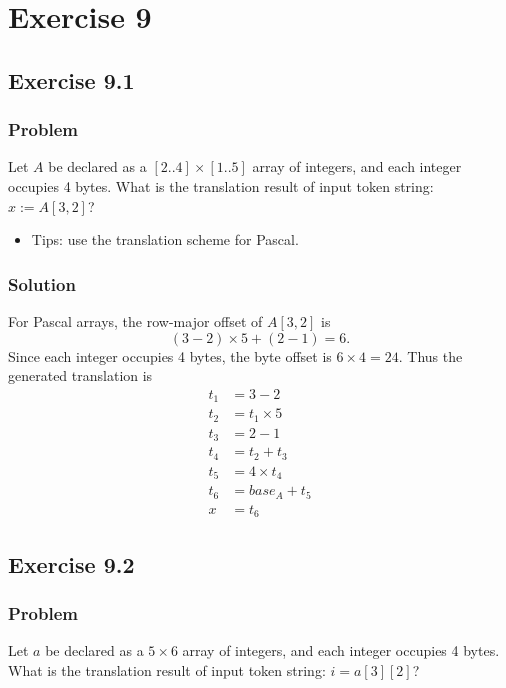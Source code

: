 \chapter{Exercise 9}

\section{Exercise 9.1}
\subsection{Problem}
Let $A$ be declared as a $[2..4] \times [1..5]$ array of integers, and each integer occupies 4 bytes.
What is the translation result of input token string: $x := A[3,2]$?

\begin{itemize}
    \item Tips: use the translation scheme for Pascal.
\end{itemize}

\subsection{Solution}
For Pascal arrays, the row-major offset of $A[3,2]$ is
\[
(3 - 2) \times 5 + (2 - 1) = 6.
\]
Since each integer occupies 4 bytes, the byte offset is $6 \times 4 = 24$.
Thus the generated translation is
\begin{align*}
t_1 &= 3 - 2 \\
t_2 &= t_1 \times 5 \\
t_3 &= 2 - 1 \\
t_4 &= t_2 + t_3 \\
t_5 &= 4 \times t_4 \\
t_6 &= base_A + t_5 \\
x &= t_6
\end{align*}

\section{Exercise 9.2}
\subsection{Problem}
Let $a$ be declared as a $5 \times 6$ array of integers, and each integer occupies 4 bytes.
What is the translation result of input token string: $i = a[3][2]$?

